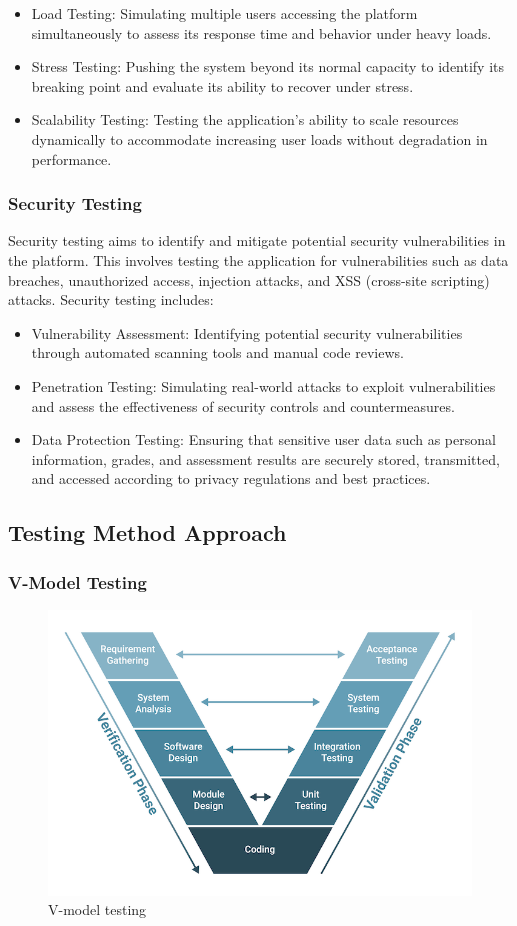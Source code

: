 		\begin{itemize}
			\item Load Testing: Simulating multiple users accessing the platform simultaneously to assess its response time and behavior under heavy loads.
			\item Stress Testing: Pushing the system beyond its normal capacity to identify its breaking point and evaluate its ability to recover under stress.
			\item Scalability Testing: Testing the application's ability to scale resources dynamically to accommodate increasing user loads without degradation in performance.
		\end{itemize}
		
		\subsubsection{Security Testing}
		
		Security testing aims to identify and mitigate potential security vulnerabilities in the platform. This involves testing the application for vulnerabilities such as data breaches, unauthorized access, injection attacks, and XSS (cross-site scripting) attacks. Security testing includes:
		
		\begin{itemize}
			\item Vulnerability Assessment: Identifying potential security vulnerabilities through automated scanning tools and manual code reviews.
			\item Penetration Testing: Simulating real-world attacks to exploit vulnerabilities and assess the effectiveness of security controls and countermeasures.
			\item Data Protection Testing: Ensuring that sensitive user data such as personal information, grades, and assessment results are securely stored, transmitted, and accessed according to privacy regulations and best practices.
		\end{itemize}

		
	\subsection{Testing Method Approach}

		\subsubsection{V-Model Testing}

		\begin{figure}[H]
			\centering
			\includegraphics[width=0.55\linewidth]{images/v-model-testing.png}
			\caption{V-model testing}
			\label{fig:v-model-testing}
		\end{figure}

